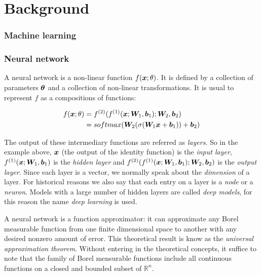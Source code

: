\chapter{Background}
\label{ch:02-background}


\subsection{Machine learning}


\subsection{Neural network}


A neural network is a non-linear function $f(\bm{x}; \theta)$. It is defined by a collection of parameters $\bm{\theta}$ and a collection of non-linear transformations. It is usual to represent $f$ as a compositions of functions:

\begin{align}
f(\bm{x}; \theta) &= f^{(2)}(f^{(1)}(\bm{x}; \bm{W}_1, \bm{b}_1); \bm{W}_2, \bm{b}_2)\\
&= softmax(\bm{W}_2 (\sigma(\bm{W}_1\bm{x} + \bm{b}_1)) + \bm{b}_2)
\end{align}


The output of these intermediary functions are referred as \textit{layers}. So in the example above, $\bm{x}$ (the output of the identity function) is the \textit{input layer}, $f^{(1)}(\bm{x}; \bm{W}_1, \bm{b}_1)$ is the \textit{hidden layer} and $f^{(2)}(f^{(1)}(\bm{x}; \bm{W}_1, \bm{b}_1); \bm{W}_2, \bm{b}_2)$ is the \textit{output layer}. Since each layer is a vector, we normally speak about the \textit{dimension} of a layer. For historical reasons we also say that each entry on a layer is a \textit{node} or a \textit{neuron}.  Models with a large number of hidden layers are called \textit{deep models}, for this reason the name \textit{deep learning} is used.  

\par A neural network is a function approximator: it can approximate any Borel measurable function from one finite dimensional space to another with any desired nonzero amount of error. This theoretical result is know as the \textit{universal approximation theorem}\cite{Cybenko}. Without entering in the theoretical concepts, it suffice to note that the family of Borel mensurable functions include all continuous functions on a closed and bounded subset of $\mathbb{R}^n$.



